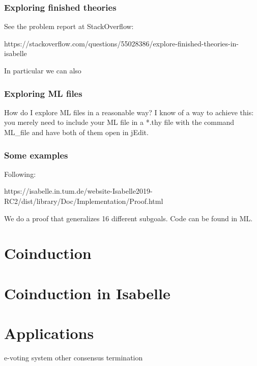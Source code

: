 \documentclass[a4paper,12pt]{article}
\theoremstyle{break}
\theoremstyle{break}
\begin{document}
\subsubsection{Exploring finished theories}

See the problem report at StackOverflow:

https://stackoverflow.com/questions/55028386/explore-finished-theories-in-isabelle

In particular we can also 

\subsubsection{Exploring ML files}

How do I explore ML files in a reasonable way? I know of a way to achieve this: you merely need to include your ML file in a *.thy file with the command ML\_file and have both of them open in jEdit. 

\subsubsection{Some examples}

Following:

https://isabelle.in.tum.de/website-Isabelle2019-RC2/dist/library/Doc/Implementation/Proof.html

We do a proof that generalizes 16 different subgoals. Code can be found in ML.

\section{Coinduction}

\section{Coinduction in Isabelle}






\section{Applications}

e-voting system
other consensus
termination

\newpage
\printbibliography
\end{document}
